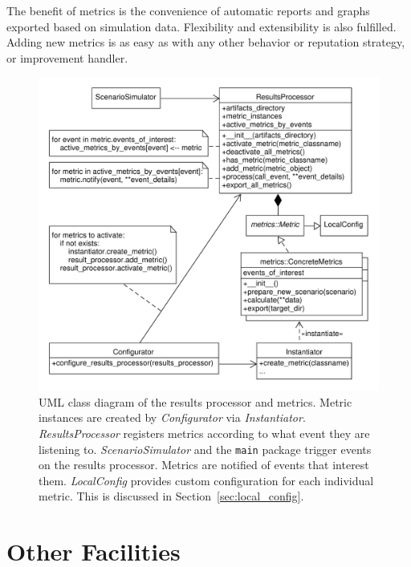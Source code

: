 \documentclass[%
    ]{\PathToTumTemplate/thesis/tum_thesis}
\begin{document}
The benefit of metrics is the convenience of automatic reports and graphs exported based on simulation data.
Flexibility and extensibility is also fulfilled.
Adding new metrics is as easy as with any other behavior or reputation strategy, or improvement handler.

\begin{figure}[tbp]
  \begin{center}
        \includegraphics[width=1\linewidth]	{../uml/reproc_metrics.pdf}
    \caption{
	UML class diagram of the results processor and metrics.
	Metric instances are created by \emph{Configurator} via \emph{Instantiator}.
	\emph{ResultsProcessor} registers metrics according to what event they are listening to.
	\emph{ScenarioSimulator} and the \lstinline{main} package trigger events on the results processor.
	Metrics are notified of events that interest them.
	\emph{LocalConfig} provides custom configuration for each individual metric.
	This is discussed in Section~\ref{sec:local_config}.
    }
    \label{fig:reproc_metrics}
  \end{center}
\end{figure}



\section{Other Facilities}\label{sec:impl_misc}
\end{document}
